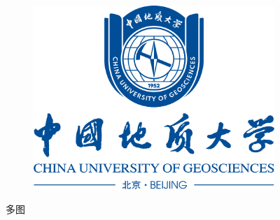 \documentclass[12pt,a4paper]{article}
\begin{document}
\begin{figure}[H]
\begin{subfigure}{0.3\textwidth}
        \includegraphics[width=\linewidth]{校徽与中英文（蓝色中轴式）.png}
    \end{subfigure}
    \caption{\label{fig:boxr}多图}
\end{figure}
\end{document}
